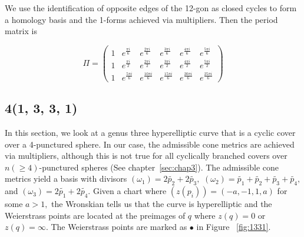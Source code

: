 \documentclass[12pt,reqno]{amsart}
\DeclareMathOperator{\Aut}{Aut}
\theoremstyle{definition}
\theoremstyle{remark}
\begin{document}
We use the identification of opposite edges of the 12-gon as closed cycles to form a homology basis and the 1-forms achieved via multipliers. Then the period matrix is

$$\Pi = \begin{pmatrix}1 & e^{\frac{\pi i}{6}} & e^{\frac{2 \pi i}{6}} & e^{\frac{3 \pi i}{6}} & e^{\frac{4 \pi i}{6}} & e^{\frac{5 \pi i}{6}}\\
1 & e^{\frac{\pi i}{2}} & e^{\frac{2 \pi i}{2}} & e^{\frac{3 \pi i}{2}} & e^{\frac{4 \pi i}{2}} & e^{\frac{5 \pi i}{2}}\\
1 & e^{\frac{5 \pi i}{6}} & e^{\frac{10 \pi i}{6}} & e^{\frac{15 \pi i}{6}} & e^{\frac{20 \pi i}{6}} & e^{\frac{25 \pi i}{6}}\end{pmatrix}$$


\subsection{4(1, 3, 3, 1)}

In this section, we look at a genus three hyperelliptic curve that is a cyclic cover over a 4-punctured sphere. In our case, the admissible cone metrics are achieved via multipliers, although this is not true for all cyclically branched covers over $n (\geq 4)$-punctured spheres (See chapter~\ref{sec:chap3}). The admissible cone metrics yield a basis with divisors $(\omega_1) = 2 \widetilde{p_2} + 2 \widetilde{p_3},$ $(\omega_2) = \widetilde{p_1} + \widetilde{p_2} + \widetilde{p_3} + \widetilde{p_4},$ and $(\omega_3) = 2 \widetilde{p_1} + 2 \widetilde{p_4}.$ Given a chart where $(z(p_i)) = (-a, -1, 1, a)$ for some $a > 1,$ the Wronskian tells us that the curve is hyperelliptic and the Weierstrass points are located at the preimages of $q$ where $z(q) = 0$ or $z(q) = \infty.$ The Weierstrass points are marked as $\bullet$ in Figure~ \cref{fig:1331}.

 
\end{document}
